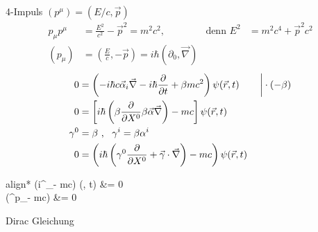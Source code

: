 4-Impuls $(p^\mu) = (E/c, \vec{p})$
	\begin{align*}
		p_\mu p^\mu &= \frac{E^2}{c^2} - \vec{p}^2 = m^2 c^2,&
		\text{denn } E^2 &= m^2 c^4 + \vec{p}^2 c^2 \\
		(p_\mu) &= \left(\frac{E}{c}, -\vec{p}\right) = i\hbar (\partial_0, \vec{\nabla})
	\end{align*}
	\begin{align*}
		0 &= \left(
			-i \hbar c \vec{\alpha}_i \vec{\nabla} - i\hbar \frac{\partial}{\partial t}
			+ \beta m c^2
		\right) \psi(\vec{r}, t) & 
		&\left.\vphantom{\left(\frac{\partial}{\partial t}\right)}\right| \cdot (-\beta) \\
		0 &= \left[
			i \hbar \left(\beta \frac{\partial}{\partial X^0} \beta \vec{\alpha} \vec{\nabla}\right)
			- mc
		\right] \psi (\vec{r}, t) \\
		\gamma^0 &= \beta ~,~~ \gamma^i =\beta \alpha^i \\
		0 &= \left(i \hbar 
			\left(\gamma^0 \frac{\partial}{\partial X^0} + \vec{\gamma} \cdot \vec{\nabla}\right)
			- mc
		\right) \psi (\vec{r}, t) 
	\end{align*}
	\begin{empheq}[box = \boxed]{align*}
		(i\hbar \gamma^\mu \partial_\mu - mc) \psi(, t) &= 0 \\
		 (\gamma^\mu p_\mu - mc) \ket{\psi} &= 0
	\end{empheq}
Dirac Gleichung
	
